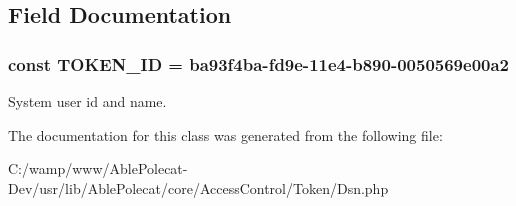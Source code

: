 \subsection{Field Documentation}
\hypertarget{class_able_polecat___access_control___token___dsn_aff6f46d57b49b4adac7118501542ea60}{}
\subsubsection[{T\+O\+K\+E\+N\+\_\+\+I\+D}]{\setlength{\rightskip}{0pt plus 5cm}const T\+O\+K\+E\+N\+\_\+\+I\+D = \textquotesingle{}ba93f4ba-\/fd9e-\/11e4-\/b890-\/0050569e00a2\textquotesingle{}}\label{class_able_polecat___access_control___token___dsn_aff6f46d57b49b4adac7118501542ea60}
System user id and name. 

The documentation for this class was generated from the following file\+:\begin{DoxyCompactItemize}
\item 
C\+:/wamp/www/\+Able\+Polecat-\/\+Dev/usr/lib/\+Able\+Polecat/core/\+Access\+Control/\+Token/Dsn.\+php\end{DoxyCompactItemize}
